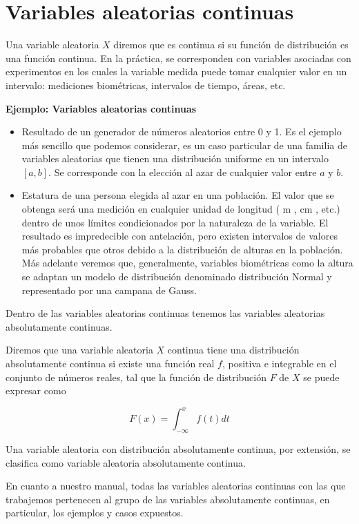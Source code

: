 \documentclass[
  a4paper,
  DIV=11,
  numbers=noendperiod]{scrreprt}
\providecommand{\tightlist}{%
  \setlength{\itemsep}{0pt}\setlength{\parskip}{0pt}}\usepackage{longtable,booktabs,array}
\begin{document}
\section{Variables aleatorias
continuas}\label{variables-aleatorias-continuas-1}

Una variable aleatoria \(X\) diremos que es continua si su función de
distribución es una función continua. En la práctica, se corresponden
con variables asociadas con experimentos en los cuales la variable
medida puede tomar cualquier valor en un intervalo: mediciones
biométricas, intervalos de tiempo, áreas, etc.

\textbf{Ejemplo: Variables aleatorias continuas}

\begin{itemize}
\tightlist
\item
  Resultado de un generador de números aleatorios entre 0 y 1. Es el
  ejemplo más sencillo que podemos considerar, es un caso particular de
  una familia de variables aleatorias que tienen una distribución
  uniforme en un intervalo \([a, b]\). Se corresponde con la elección al
  azar de cualquier valor entre \(a\) y \(b\).
\item
  Estatura de una persona elegida al azar en una población. El valor que
  se obtenga será una medición en cualquier unidad de longitud ( m , cm
  , etc.) dentro de unos límites condicionados por la naturaleza de la
  variable. El resultado es impredecible con antelación, pero existen
  intervalos de valores más probables que otros debido a la distribución
  de alturas en la población. Más adelante veremos que, generalmente,
  variables biométricas como la altura se adaptan un modelo de
  distribución denominado distribución Normal y representado por una
  campana de Gauss.
\end{itemize}

Dentro de las variables aleatorias continuas tenemos las variables
aleatorias absolutamente continuas.

Diremos que una variable aleatoria \(X\) continua tiene una distribución
absolutamente continua si existe una función real \(f\), positiva e
integrable en el conjunto de números reales, tal que la función de
distribución \(F\) de \(X\) se puede expresar como

\[
F(x)=\int_{-\infty}^{x} f(t) d t
\]

Una variable aleatoria con distribución absolutamente continua, por
extensión, se clasifica como variable aleatoria absolutamente continua.

En cuanto a nuestro manual, todas las variables aleatorias continuas con
las que trabajemos pertenecen al grupo de las variables absolutamente
continuas, en particular, los ejemplos y casos expuestos.
\end{document}
